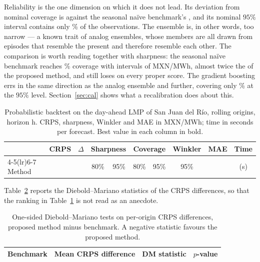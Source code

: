 \documentclass[12pt,a4paper]{article}
\begin{document}
Reliability is the one dimension on which it does not lead. Its deviation from
nominal coverage is \APREL{} against the seasonal na\"ive benchmark's
\SNREL{}, and its nominal $95\%$ interval contains only \APCOVNINETYFIVE\% of the
observations. The ensemble is, in other words, too narrow — a known trait of
analog ensembles, whose members are all drawn from episodes that resemble the
present and therefore resemble each other. The comparison is worth reading
together with sharpness: the seasonal na\"ive benchmark reaches
\SNCOVNINETYFIVE\% coverage with intervals of \SNSHARPNINETYFIVE{} MXN/MWh, almost twice the
\APSHARPNINETYFIVE{} of the proposed method, and still loses on every proper score.
The gradient boosting errs in the same direction as the analog ensemble and
further, covering only \LGBMCOVNINETYFIVE\% at the $95\%$ level. Section~\ref{sec:cal}
shows what a recalibration does about this.

\begin{table}[htbp]
\centering
\caption{Probabilistic backtest on the day-ahead LMP of San Juan del R\'io,
\NORIGINS{} rolling origins, horizon \HORIZON{} h. CRPS, sharpness, Winkler
and MAE in MXN/MWh; time in seconds per forecast. Best value in each column
in bold.}
\label{tab:main}
\small
\begin{tabular}{lccccccccc}
\toprule
& \multicolumn{1}{c}{CRPS} & $\Delta$ & \multicolumn{2}{c}{Sharpness} &
\multicolumn{2}{c}{Coverage} & Winkler & MAE & Time \\
\cmidrule(lr){4-5}\cmidrule(lr){6-7}
Method & & & 80\% & 95\% & 80\% & 95\% & 95\% & & (s) \\
\midrule

\bottomrule
\end{tabular}
\end{table}

Table~\ref{tab:dm} reports the Diebold--Mariano statistics of the CRPS
differences, so that the ranking in Table~\ref{tab:main} is not read as an
anecdote.

\begin{table}[htbp]
\centering
\caption{One-sided Diebold--Mariano tests on per-origin CRPS differences,
proposed method minus benchmark. A negative statistic favours the proposed
method.}
\label{tab:dm}
\small
\begin{tabular}{lccc}
\toprule
Benchmark & Mean CRPS difference & DM statistic & $p$-value \\
\midrule

\bottomrule
\end{tabular}
\end{table}
\end{document}
